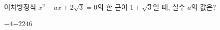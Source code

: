 이차방정식 $x^2-ax+2\sqrt{3}=0$의 한 근이 $1+\sqrt{3}$일 때, 실수 $a$의 값은?
\begin{choices32}{$-4$}{$-2$}{$2$}{$4$}{$6$}\end{choices32}
